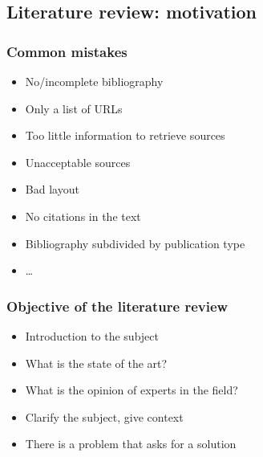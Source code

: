 \documentclass{beamer}
\begin{document}
\subsection{Literature review: motivation}


\begin{frame}
  \frametitle{Common mistakes}

  \begin{itemize}
    \item No/incomplete bibliography
    \item Only a list of URLs
    \item Too little information to retrieve sources
    \item Unacceptable sources
    \item Bad layout
    \item No citations in the text
    \item Bibliography subdivided by publication type
    \item \ldots
  \end{itemize}
\end{frame}

\begin{frame}
  \frametitle{Objective of the literature review}

  \begin{itemize}
    \item Introduction to the subject
    \item What is the state of the art?
    \item What is the opinion of experts in the field?
    \item Clarify the subject, give context
    \item There is a problem that asks for a solution
  \end{itemize}

  \vfill

\end{frame}
\end{document}
